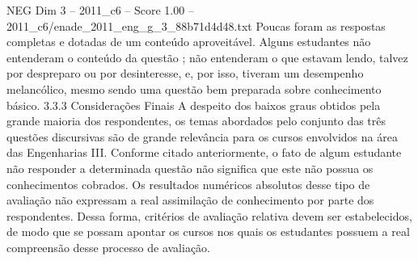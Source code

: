 \begin{textsample}{NEG Dim 3 – 2011\_c6 – Score 1.00 – 2011\_c6/enade\_2011\_eng\_g\_3\_88b71d4d48.txt}
Poucas foram as respostas completas e dotadas de um conteúdo aproveitável.
Alguns estudantes não entenderam o conteúdo da questão ; não entenderam o que estavam lendo, talvez por despreparo ou por desinteresse, e, por isso, tiveram um desempenho melancólico, mesmo sendo uma questão bem preparada sobre conhecimento básico. 3.3.3 Considerações Finais A despeito dos baixos graus obtidos pela grande maioria dos respondentes, os temas abordados pelo conjunto das três questões discursivas são de grande relevância para os cursos envolvidos na área das Engenharias III.
Conforme citado anteriormente, o fato de algum estudante não responder a determinada questão não significa que este não possua os conhecimentos cobrados.
Os resultados numéricos absolutos desse tipo de avaliação não expressam a real assimilação de conhecimento por parte dos respondentes.
Dessa forma, critérios de avaliação relativa devem ser estabelecidos, de modo que se possam apontar os cursos nos quais os estudantes possuem a real compreensão desse processo de avaliação.

\end{textsample}
